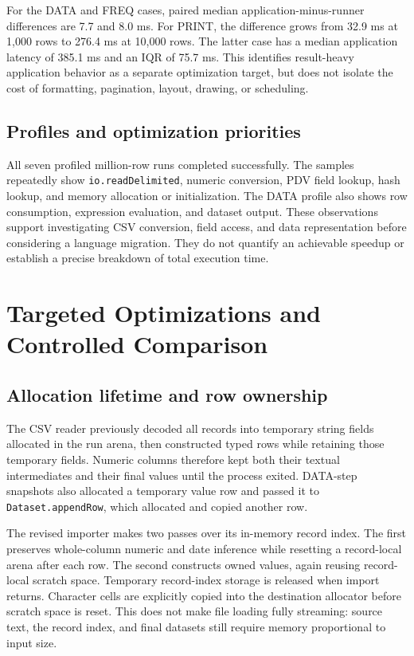 \documentclass[11pt,a4paper]{article}
\begin{document}
For the DATA and FREQ cases, paired median application-minus-runner
differences are 7.7 and 8.0 ms. For PRINT, the difference grows
from 32.9 ms at 1,000 rows to 276.4 ms at 10,000 rows. The latter
case has a median application latency of 385.1 ms and an IQR of
75.7 ms. This identifies result-heavy application behavior as a
separate optimization target, but does not isolate the cost of
formatting, pagination, layout, drawing, or scheduling.

\subsection{Profiles and optimization priorities}

All seven profiled million-row runs completed successfully.
The samples repeatedly show \texttt{io.readDelimited}, numeric
conversion, PDV field lookup, hash lookup, and memory allocation
or initialization. The DATA profile also shows row consumption,
expression evaluation, and dataset output. These observations
support investigating CSV conversion, field access, and data
representation before considering a language migration. They
do not quantify an achievable speedup or establish a precise
breakdown of total execution time.

\section{Targeted Optimizations and Controlled Comparison}
\label{sec:optimization}

\subsection{Allocation lifetime and row ownership}

The CSV reader previously decoded all records into temporary
string fields allocated in the run arena, then constructed
typed rows while retaining those temporary fields. Numeric
columns therefore kept both their textual intermediates and
their final values until the process exited. DATA-step snapshots
also allocated a temporary value row and passed it to
\texttt{Dataset.appendRow}, which allocated and copied another row.

The revised importer makes two passes over its in-memory record
index. The first preserves whole-column numeric and date
inference while resetting a record-local arena after each row.
The second constructs owned values, again reusing record-local
scratch space. Temporary record-index storage is released when
import returns. Character cells are explicitly copied into the
destination allocator before scratch space is reset. This does
not make file loading fully streaming: source text, the record
index, and final datasets still require memory proportional to
input size.
\end{document}

